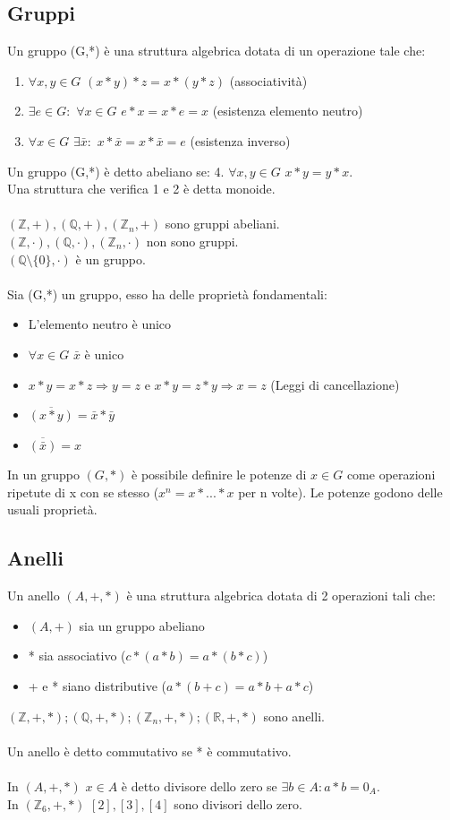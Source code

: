\documentclass{article}
\begin{document}
\subsection{Gruppi}
Un gruppo (G,*) è una struttura algebrica dotata di un operazione tale che:
\begin{enumerate}
    \item $\forall x,y\in G$ $(x*y)*z=x*(y*z)$ (associatività)
    \item $\exists e\in G:$ $\forall x\in G$ $e*x=x*e=x$ (esistenza elemento neutro)
    \item $\forall x\in G$ $\exists\bar{x}:$ $x*\bar{x}=x*\bar{x}=e$ (esistenza inverso)
\end{enumerate}
Un gruppo (G,*) è detto abeliano se: 4. $\forall x,y\in G$ $x*y=y*x$.\\
Una struttura che verifica 1 e 2 è detta monoide.\\\\
$(\mathds{Z},+), (\mathds{Q},+), (\mathds{Z}_n, +)$ sono gruppi abeliani.\\
$(\mathds{Z},\cdot), (\mathds{Q},\cdot), (\mathds{Z}_n, \cdot)$ non sono gruppi.\\
$(\mathds{Q}\setminus\{0\},\cdot)$ è un gruppo.\\\\
Sia (G,*) un gruppo, esso ha delle proprietà fondamentali:
\begin{itemize}
    \item L'elemento neutro è unico
    \item $\forall x\in G$ $\bar{x}$ è unico
    \item $x*y=x*z\Rightarrow y=z$ e $x*y=z*y\Rightarrow x=z$ (Leggi di cancellazione)
    \item $\overline{(x*y)}=\bar{x}*\bar{y}$
    \item $\overline{(\bar{x})}=x$
\end{itemize}
In un gruppo $(G,*)$ è possibile definire le potenze di $x\in G$ come operazioni ripetute di x con se stesso ($x^n=x*...*x$ per n volte). Le potenze godono delle usuali proprietà.

\subsection{Anelli}
Un anello $(A,+,*)$ è una struttura algebrica dotata di 2 operazioni tali che:
\begin{itemize}
    \item $(A,+)$ sia un gruppo abeliano
    \item * sia associativo ($c*(a*b)=a*(b*c)$)
    \item + e * siano distributive ($a*(b+c)=a*b+a*c$)
\end{itemize}
$(\mathds{Z},+,*);(\mathds{Q},+,*);(\mathds{Z}_n,+,*);(\mathds{R},+,*)$ sono anelli.\\\\
Un anello è detto commutativo se * è commutativo.\\\\
In $(A,+,*)$ $x\in A$ è detto divisore dello zero se $\exists b\in A: a*b=0_A$.\\
In $(\mathds{Z}_6,+,*)$ $[2],[3],[4]$ sono divisori dello zero.
\end{document}
